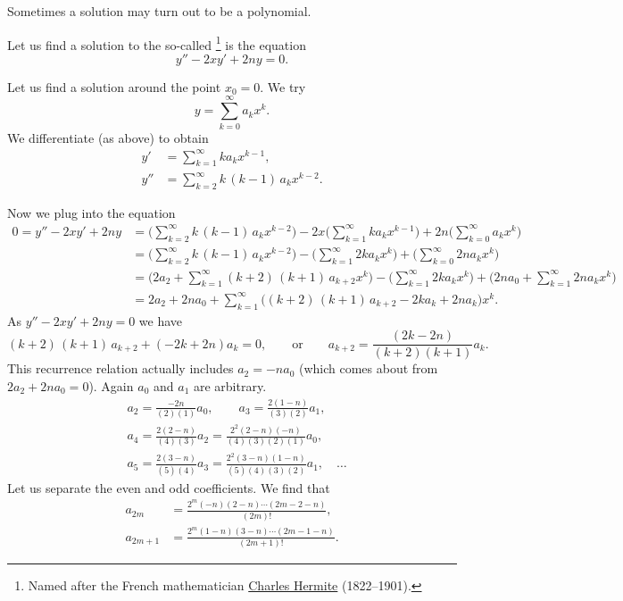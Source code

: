\medskip

Sometimes a solution may turn out to be a polynomial.

\begin{example}
Let us find a solution to the so-called
\emph{}%
\footnote{Named after the French mathematician
\href{http://en.wikipedia.org/wiki/Hermite}{Charles Hermite}
(1822--1901).} is the equation
\begin{equation*}
y'' -2xy' + 2n y = 0 .
\end{equation*}

Let us find a solution around the point $x_0 = 0$.
We try
\begin{equation*}
y = \sum_{k=0}^\infty a_k x^k .
\end{equation*}
We differentiate (as above) to obtain
\begin{align*}
y' &= \sum_{k=1}^\infty k a_k x^{k-1} ,
\\
y'' &= \sum_{k=2}^\infty k\,(k-1) \, a_k x^{k-2} .
\end{align*}

Now we plug into the equation
\begin{equation*}
\begin{split}
0 = y''-2xy'+2ny &= 
\Biggl( \sum_{k=2}^\infty k\,(k-1) \, a_k x^{k-2}  \Biggr)
-
2x
\Biggl( \sum_{k=1}^\infty k a_k x^{k-1} \Biggr)
+
2n
\Biggl( \sum_{k=0}^\infty a_k x^k \Biggr)
\\
&=
\Biggl( \sum_{k=2}^\infty k\,(k-1) \, a_k x^{k-2}  \Biggr)
-
\Biggl( \sum_{k=1}^\infty 2k a_k x^k \Biggr)
+
\Biggl( \sum_{k=0}^\infty 2n a_k x^k \Biggr)
\\
&=
\Biggl(2a_2+
 \sum_{k=1}^\infty (k+2)\,(k+1) \, a_{k+2} x^k  \Biggr)
-
\Biggl( \sum_{k=1}^\infty 2k a_k x^k \Biggr)
+
\Biggl(
2na_0 + 
\sum_{k=1}^\infty 2n a_k x^k \Biggr)
\\
&=
2a_2+2na_0+
\sum_{k=1}^\infty \bigl( (k+2)\,(k+1) \, a_{k+2} - 2ka_k + 2n a_k \bigr) x^k .
\end{split}
\end{equation*}
As $y''-2xy'+2ny = 0$ we have
\begin{equation*}
(k+2)\,(k+1) \, a_{k+2} + ( - 2k+ 2n) a_k = 0 ,
\qquad
\text{or}
\qquad
a_{k+2} = \frac{(2k-2n)}{(k+2)(k+1)} a_k .
\end{equation*}
This recurrence relation actually includes
$a_2 = -na_0$ (which comes about from $2a_2+2na_0 = 0$).
Again $a_0$ and $a_1$ are arbitrary.
\begin{align*}
& a_2 = \frac{-2n}{(2)(1)}a_0, \qquad
a_3 = \frac{2(1-n)}{(3)(2)} a_1,
\\
& a_4 = \frac{2(2-n)}{(4)(3)} a_2 = \frac{2^2(2-n)(-n)}{(4)(3)(2)(1)} a_0 ,
\\
&
a_5 = \frac{2(3-n)}{(5)(4)} a_3 = \frac{2^2(3-n)(1-n)}{(5)(4)(3)(2)} a_1 ,
\quad \ldots
\end{align*}
Let us separate the even and odd coefficients.
We find that 
\begin{align*}
a_{2m} &=\frac{2^m(-n)(2-n)\cdots(2m-2-n)}{(2m)!} , \\
a_{2m+1} &=\frac{2^m(1-n)(3-n)\cdots(2m-1-n)}{(2m+1)!} .
\end{align*}


\end{example}
